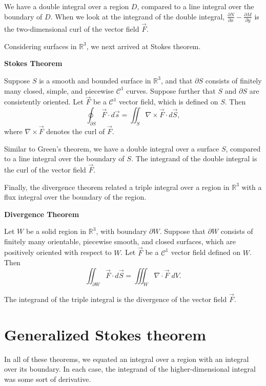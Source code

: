 \documentclass{ximera}
\begin{document}
We have a double integral over a region $D$, compared to a line integral over the boundary of $D$. When we look at the integrand of the double integral, $\frac{\partial N}{\partial x} - \frac{\partial M}{\partial y}$ is the two-dimensional curl of the vector field $\vec{F}$.

Considering surfaces in $\mathbb{R}^3$, we next arrived at Stokes theorem.

\begin{theorem}
\textbf{Stokes Theorem}

Suppose $S$ is a smooth and bounded surface in $\mathbb{R}^3$, and that $\partial S$ consists of finitely many closed, simple, and piecewise $\mathcal{C}^1$ curves. Suppose further that $S$ and $\partial S$ are consistently oriented. Let $\vec{F}$ be a $\mathcal{C}^1$ vector field, which is defined on $S$. Then
\[
\oint_{\partial S}\vec{F}\cdot d\vec{s} = \iint_S \nabla\times \vec{F}\cdot d\vec{S},
\]
where $\nabla\times \vec{F}$ denotes the curl of $\vec{F}$.
\end{theorem}

Similar to Green's theorem, we have a double integral over a surface $S$, compared to a line integral over the boundary of $S$. The integrand of the double integral is the curl of the vector field $\vec{F}$.

Finally, the divergence theorem related a triple integral over a region in $\mathbb{R}^3$ with a flux integral over the boundary of the region.

\begin{theorem}
\textbf{Divergence Theorem}

Let $W$ be a solid region in $\mathbb{R}^3$, with boundary $\partial W$. Suppose that $\partial W$ consists of finitely many orientable, piecewise smooth, and closed surfaces, which are positively oriented with respect to $W$. Let $\vec{F}$ be a $\mathcal{C}^1$ vector field defined on $W$. Then
\[
\iint_{\partial W} \vec{F}\cdot d\vec{S} = \iiint_W \nabla\cdot \vec{F}\;dV.
\]
\end{theorem}

The integrand of the triple integral is the divergence of the vector field $\vec{F}$.

\section*{Generalized Stokes theorem}

In all of these theorems, we equated an integral over a region with an integral over its boundary. In each case, the integrand of the higher-dimensional integral was some sort of derivative.
\end{document}
